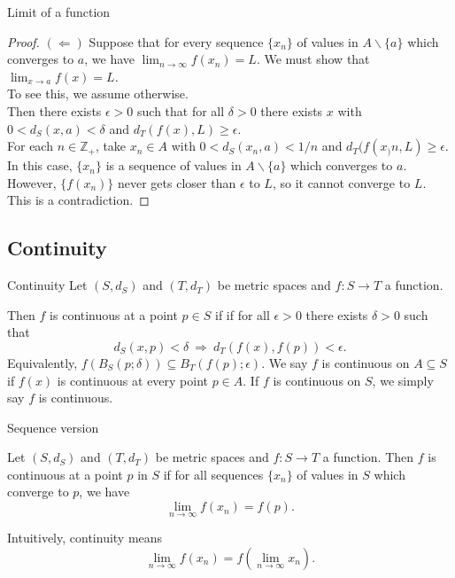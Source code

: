 \documentclass{beamer}
\begin{document}
\begin{frame}{Limit of a function}
\begin{proof}
$(\Leftarrow)$\quad
Suppose that for every sequence $\{x_n\}$ of values in $A\backslash\{a\}$ which converges to $a$, we have $\lim_{n\rightarrow \infty} f(x_n) = L$.
\pause
We must show that $\lim_{x\rightarrow a} f(x) = L$.\\
\pause
To see this, we assume otherwise.\\
\pause
Then there exists $\epsilon > 0$ such that for all $\delta > 0$ there exists $x$ with $0 < d_S(x,a) < \delta$ and $d_T(f(x),L) \geq \epsilon$.\\
\pause
For each $n\in \mathbb{Z}_+$, take $x_n\in A$ with $0 < d_S(x_n,a) < 1/n$ and $d_T(f(x_)n,L) \geq \epsilon$.\\
\pause
In this case, $\{x_n\}$ is a sequence of values in $A\backslash\{a\}$ which converges to $a$.\\
\pause
However, $\{f(x_n)\}$ never gets closer than $\epsilon$ to $L$, so it cannot converge to $L$.\\
\pause
This is a contradiction.
\end{proof}
\end{frame}

\subsection{Continuity}

\begin{frame}{Continuity}
Let $(S,d_S)$ and $(T,d_T)$ be metric spaces and $f: S\rightarrow T$ a function.
\pause
\begin{defn}
\pause
Then $f$ is continuous at a point $p\in S$ if 
if for all $\epsilon > 0$ there exists $\delta > 0$ such that
$$d_S(x,p) < \delta\ \Rightarrow\ d_T(f(x),f(p)) < \epsilon.$$
\pause
Equivalently, $f(B_S(p;\delta))\subseteq B_T(f(p);\epsilon)$.
\pause
We say $f$ is continuous on $A\subseteq S$ if $f(x)$ is continuous at every point $p\in A$.
\pause
If $f$ is continuous on $S$, we simply say $f$ is continuous.
\end{defn}
\end{frame}

\begin{frame}{Sequence version}
\pause
\begin{thm}
Let $(S,d_S)$ and $(T,d_T)$ be metric spaces and $f: S\rightarrow T$ a function.
\pause
Then $f$ is continuous at a point $p$ in $S$ if for all sequences $\{x_n\}$ of values in $S$ which converge to $p$, we have
\pause
$$\lim_{n\rightarrow\infty} f(x_n) = f(p).$$
\end{thm}
\pause
Intuitively, continuity means
$$\lim_{n\rightarrow\infty} f(x_n) = f\left(\lim_{n\rightarrow\infty} x_n\right).$$
\end{frame}
\end{document}

